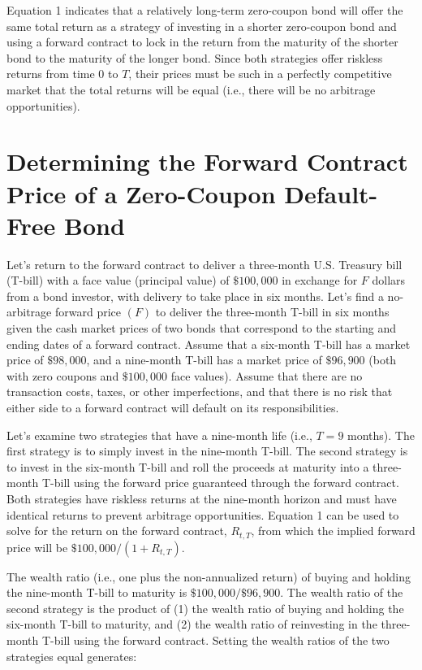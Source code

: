 \documentclass[11pt]{article}
\begin{document}
Equation 1 indicates that a relatively long-term zero-coupon bond will offer the same total return as a strategy of investing in a shorter zero-coupon bond and using a forward contract to lock in the return from the maturity of the shorter bond to the maturity of the longer bond. Since both strategies offer riskless returns from time 0 to $T$, their prices must be such in a perfectly competitive market that the total returns will be equal (i.e., there will be no arbitrage opportunities).

\section*{Determining the Forward Contract Price of a Zero-Coupon Default-Free Bond}
Let's return to the forward contract to deliver a three-month U.S. Treasury bill (T-bill) with a face value (principal value) of $\$ 100,000$ in exchange for $F$ dollars from a bond investor, with delivery to take place in six months. Let's find a no-arbitrage forward price $(F)$ to deliver the three-month T-bill in six months given the cash market prices of two bonds that correspond to the starting and ending dates of a forward contract. Assume that a six-month T-bill has a market price of $\$ 98,000$, and a nine-month T-bill has a market price of $\$ 96,900$ (both with zero coupons and $\$ 100,000$ face values). Assume that there are no transaction costs, taxes, or other imperfections, and that there is no risk that either side to a forward contract will default on its responsibilities.

Let's examine two strategies that have a nine-month life (i.e., $T=9$ months). The first strategy is to simply invest in the nine-month T-bill. The second strategy is to invest in the six-month T-bill and roll the proceeds at maturity into a three-month T-bill using the forward price guaranteed through the forward contract. Both strategies have riskless returns at the nine-month horizon and must have identical returns to prevent arbitrage opportunities. Equation 1 can be used to solve for the return on the forward contract, $R_{t, T}$, from which the implied forward price will be $\$ 100,000 /\left(1+R_{t, T}\right)$.

The wealth ratio (i.e., one plus the non-annualized return) of buying and holding the nine-month T-bill to maturity is $\$ 100,000 / \$ 96,900$. The wealth ratio of the second strategy is the product of (1) the wealth ratio of buying and holding the six-month T-bill to maturity, and (2) the wealth ratio of reinvesting in the three-month T-bill using the forward contract. Setting the wealth ratios of the two strategies equal generates:
\end{document}
